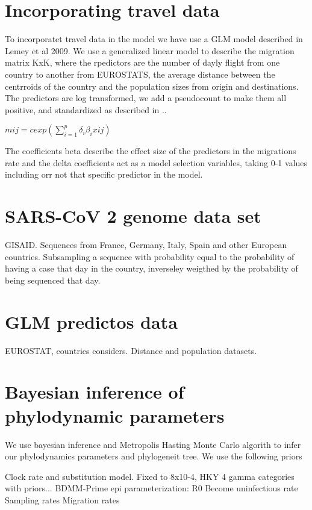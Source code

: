 \section{Incorporating travel data}

To incorporatet travel data in the model we have use a GLM model described in Lemey et al 2009. We use a generalized linear model to describe the migration matrix KxK, where the rpedictors are the number of dayly flight from one country to another from EUROSTATS, the average distance between the centrroids of the country and the population sizes from origin and destinations. The predictors are log transformed, we add a pseudocount to make them all positive, and standardized as described in ..

$mij = c exp(\sum_{i = 1}^p \delta_i \beta_i xij)$

The coefficients beta describe the effect size of the predictors in the migrations rate and the delta coefficients act as a model selection variables, taking 0-1 values including orr not that specific predictor in the model.


\section{SARS-CoV 2 genome data set}

GISAID. Sequences from France, Germany, Italy, Spain and other European countries. Subsampling a sequence with probability equal to the probability of having a case that day in the country, inverseley weigthed by the probability of being sequenced that day. 

\section{GLM predictos data}

EUROSTAT, countries considers. Distance and population datasets.


\section{Bayesian inference of phylodynamic parameters}

We use bayesian inference and Metropolis Hasting Monte Carlo algorith to infer our phylodynamics parameters and phylogeneit tree. We use the following priors

Clock rate and substitution model. Fixed to 8x10-4, HKY 4 gamma categories with priors...
BDMM-Prime epi parameterization:
R0
Become uninfectious rate
Sampling rates
Migration rates


